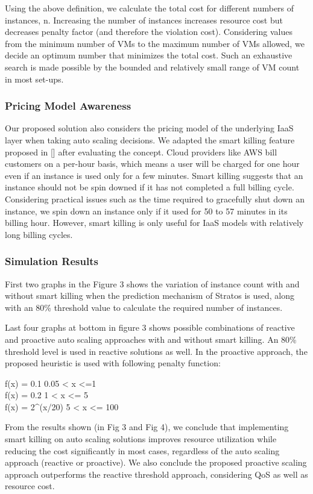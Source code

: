 Using the above definition, we calculate the total cost for different numbers of instances, n. Increasing the number of instances increases resource cost but decreases penalty factor (and therefore the violation cost). Considering values from the minimum number of VMs to the maximum number of VMs allowed, we decide an optimum number that minimizes the total cost. Such an exhaustive search is made possible by the bounded and relatively small range of VM count in most set-ups.
\subsubsection {Pricing Model Awareness}

Our proposed solution also considers the pricing model of the underlying IaaS layer when taking auto scaling decisions. We adapted the smart killing feature proposed in [\cite{pluggable}] after evaluating the concept. Cloud providers like AWS bill customers on a per-hour basis, which means a user will be charged for one hour even if an instance is used only for a few minutes. Smart killing suggests that an instance should not be spin downed if it has not completed a full billing cycle. Considering practical issues such as the time required to gracefully shut down an instance, we spin down an instance only if it used for 50 to 57 minutes in its billing hour. However, smart killing is only useful for IaaS models with relatively long billing cycles.

\subsubsection{Simulation Results}
First two graphs in the Figure 3 shows the variation of instance count with and without smart killing when the prediction mechanism of Stratos is used, along with an 80\% threshold value to calculate the required number of instances.

Last four graphs at bottom in figure 3 shows possible combinations of reactive and proactive auto scaling approaches with and without smart killing. An 80\% threshold level is used in reactive solutions as well. In the proactive approach, the proposed heuristic is used with following penalty function:

f(x) = 0.1    0.05 < x <=1 \\
f(x) = 0.2    1 < x <= 5 \\
f(x) = 2^(x/20)    5 < x <= 100 

From the results shown (in Fig 3 and Fig 4), we conclude that implementing smart killing on auto scaling solutions improves resource utilization while reducing the cost significantly in most cases, regardless of the auto scaling approach (reactive or proactive). We also conclude the proposed proactive scaling approach outperforms the reactive threshold approach, considering QoS as well as resource cost.

